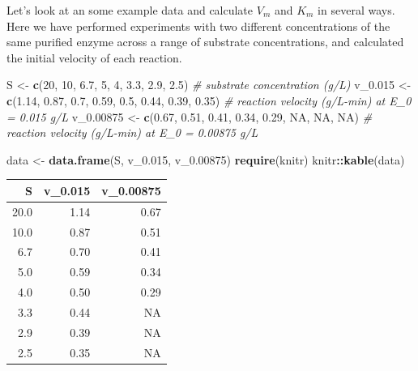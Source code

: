\documentclass[
]{article}
\newenvironment{Shaded}{\begin{snugshade}}{\end{snugshade}}
\newcommand{\CommentTok}[1]{\textcolor[rgb]{0.56,0.35,0.01}{\textit{#1}}}
\newcommand{\ConstantTok}[1]{\textcolor[rgb]{0.56,0.35,0.01}{#1}}
\newcommand{\DecValTok}[1]{\textcolor[rgb]{0.00,0.00,0.81}{#1}}
\newcommand{\FloatTok}[1]{\textcolor[rgb]{0.00,0.00,0.81}{#1}}
\newcommand{\FunctionTok}[1]{\textcolor[rgb]{0.13,0.29,0.53}{\textbf{#1}}}
\newcommand{\NormalTok}[1]{#1}
\newcommand{\OtherTok}[1]{\textcolor[rgb]{0.56,0.35,0.01}{#1}}
\newcommand{\SpecialCharTok}[1]{\textcolor[rgb]{0.81,0.36,0.00}{\textbf{#1}}}
\begin{document}
Let's look at an some example data and calculate \(V_m\) and \(K_m\) in several ways. Here we have performed experiments with two different concentrations of the same purified enzyme across a range of substrate concentrations, and calculated the initial velocity of each reaction.

\begin{Shaded}
\begin{Highlighting}[]
\NormalTok{S }\OtherTok{\textless{}{-}} \FunctionTok{c}\NormalTok{(}\DecValTok{20}\NormalTok{, }\DecValTok{10}\NormalTok{, }\FloatTok{6.7}\NormalTok{, }\DecValTok{5}\NormalTok{, }\DecValTok{4}\NormalTok{, }\FloatTok{3.3}\NormalTok{, }\FloatTok{2.9}\NormalTok{, }\FloatTok{2.5}\NormalTok{)  }\CommentTok{\# substrate concentration (g/L)}
\NormalTok{v\_0}\FloatTok{.015} \OtherTok{\textless{}{-}} \FunctionTok{c}\NormalTok{(}\FloatTok{1.14}\NormalTok{, }\FloatTok{0.87}\NormalTok{, }\FloatTok{0.7}\NormalTok{, }\FloatTok{0.59}\NormalTok{, }\FloatTok{0.5}\NormalTok{, }\FloatTok{0.44}\NormalTok{, }\FloatTok{0.39}\NormalTok{,}
    \FloatTok{0.35}\NormalTok{)  }\CommentTok{\# reaction velocity (g/L{-}min) at E\_0 = 0.015 g/L}
\NormalTok{v\_0}\FloatTok{.00875} \OtherTok{\textless{}{-}} \FunctionTok{c}\NormalTok{(}\FloatTok{0.67}\NormalTok{, }\FloatTok{0.51}\NormalTok{, }\FloatTok{0.41}\NormalTok{, }\FloatTok{0.34}\NormalTok{, }\FloatTok{0.29}\NormalTok{, }\ConstantTok{NA}\NormalTok{, }\ConstantTok{NA}\NormalTok{,}
    \ConstantTok{NA}\NormalTok{)  }\CommentTok{\# reaction velocity (g/L{-}min) at E\_0 = 0.00875 g/L}

\NormalTok{data }\OtherTok{\textless{}{-}} \FunctionTok{data.frame}\NormalTok{(S, v\_0}\FloatTok{.015}\NormalTok{, v\_0}\FloatTok{.00875}\NormalTok{)}
\FunctionTok{require}\NormalTok{(knitr)}
\NormalTok{knitr}\SpecialCharTok{::}\FunctionTok{kable}\NormalTok{(data)}
\end{Highlighting}
\end{Shaded}

\begin{tabular}{r|r|r}
\hline
S & v\_0.015 & v\_0.00875\\
\hline
20.0 & 1.14 & 0.67\\
\hline
10.0 & 0.87 & 0.51\\
\hline
6.7 & 0.70 & 0.41\\
\hline
5.0 & 0.59 & 0.34\\
\hline
4.0 & 0.50 & 0.29\\
\hline
3.3 & 0.44 & NA\\
\hline
2.9 & 0.39 & NA\\
\hline
2.5 & 0.35 & NA\\
\hline
\end{tabular}
\end{document}
